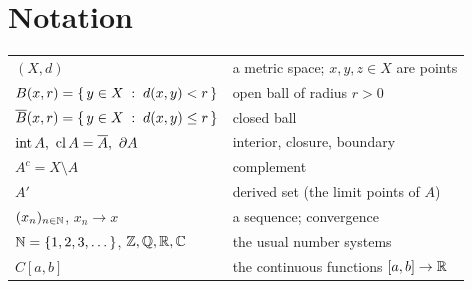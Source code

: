 \section*{Notation}
\begin{tabularx}{\textwidth}{@{}lY@{}}
$(X,d)$ & a metric space; $x,y,z\in X$ are points \\
$B(x,r)=\left\{\, y\in X \;:\; d(x,y)<r \,\right\}$ & open ball of radius $r>0$ \\
$\overline{B}(x,r)=\left\{\, y\in X \;:\; d(x,y)\le r \,\right\}$ & closed ball \\
$\operatorname{int} A,\ \operatorname{cl} A = \overline{A},\ \partial A$ & interior, closure, boundary \\
$A^c = X\setminus A$ & complement \\
$A'$ & derived set (the limit points of $A$) \\
$(x_n)_{n\in\mathbb{N}}$, $x_n\to x$ & a sequence; convergence \\
$\mathbb{N}=\{1,2,3,\dots\}$, $\mathbb{Z},\mathbb{Q},\mathbb{R},\mathbb{C}$ & the usual number systems \\
$C[a,b]$ & the continuous functions $[a,b]\to\mathbb{R}$ \\
\end{tabularx}

\tableofcontents
\clearpage
{}
